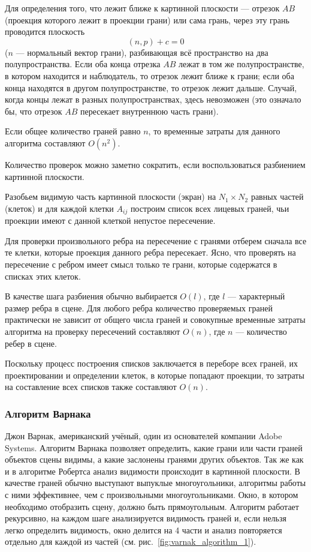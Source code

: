 Для определения того, что лежит ближе к картинной плоскости — отрезок \( AB \) (проекция которого лежит в проекции грани) или сама грань, через эту грань проводится плоскость
\[
(n, p) + c = 0
\]
(\( n \) — нормальный вектор грани), разбивающая всё пространство на два полупространства. Если оба конца отрезка \( AB \) лежат в том же полупространстве, в котором находится и наблюдатель, то отрезок лежит ближе к грани; если оба конца находятся в другом полупространстве, то отрезок лежит дальше. Случай, когда концы лежат в разных полупространствах, здесь невозможен (это означало бы, что отрезок \( AB \) пересекает внутреннюю часть грани).

Если общее количество граней равно \( n \), то временные затраты для данного алгоритма составляют \( O(n^2) \).

Количество проверок можно заметно сократить, если воспользоваться разбиением картинной плоскости.

Разобьем видимую часть картинной плоскости (экран) на \( N_1 \times N_2 \) равных частей (клеток) и для каждой клетки \( A_{ij} \) построим список всех лицевых граней, чьи проекции имеют с данной клеткой непустое пересечение.

Для проверки произвольного ребра на пересечение с гранями отберем сначала все те клетки, которые проекция данного ребра пересекает. Ясно, что проверять на пересечение с ребром имеет смысл только те грани, которые содержатся в списках этих клеток.

В качестве шага разбиения обычно выбирается \( O(l) \), где \( l \) — характерный размер ребра в сцене. Для любого ребра количество проверяемых граней практически не зависит от общего числа граней и совокупные временные затраты алгоритма на проверку пересечений составляют \( O(n) \), где \( n \) — количество ребер в сцене.

Поскольку процесс построения списков заключается в переборе всех граней, их проектировании и определении клеток, в которые попадают проекции, то затраты на составление всех списков также составляют \( O(n) \).~\cite{shishkin}




\subsubsection{Алгоритм Варнака}

\hspace{1.25cm}
Джон Варнак, американский учёный, один из основателей компании
Adobe Systems. Алгоритм Варнака позволяет определить, какие грани или части граней объектов сцены видимы, а какие заслонены гранями
других объектов. Так же как и в алгоритме Робертса анализ видимости
происходит в картинной плоскости. В качестве граней обычно выступают
выпуклые многоугольники, алгоритмы работы с ними эффективнее, чем с
произвольными многоугольниками. Окно, в котором необходимо отобразить сцену, должно быть прямоугольным. Алгоритм работает рекурсивно, на каждом шаге анализируется видимость граней и, если нельзя легко определить видимость, окно делится на 4 части и анализ повторяется отдельно для каждой из частей (см. рис.~\ref{fig:varnak_algorithm_1}).

